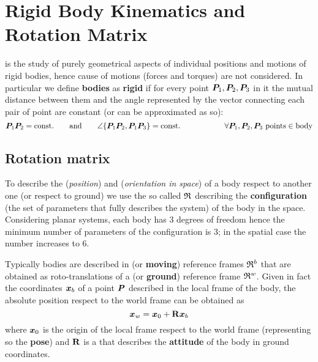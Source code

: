 \chapter{Rigid Body Kinematics and Rotation Matrix}
	
	 is the study of purely geometrical aspects of individual positions and motions of rigid bodies, hence cause of motions (forces and torques) are not considered. In particular we define \textbf{bodies} as \textbf{rigid} if for every point $\boldsymbol{P}_1, \boldsymbol{P}_2, \boldsymbol{P}_3$ in it the mutual distance between them and the angle represented by the vector connecting each pair of point are constant (or can be approximated as so):
	\[ \boldsymbol{P}_1 \boldsymbol{P}_2 = \textrm{const.} \qquad \textrm{and} \qquad \angle  \{ \boldsymbol{P}_1 \boldsymbol{P}_2, \boldsymbol{P}_1\boldsymbol{P}_3 \} = \textrm{const.} \hspace{2cm} \forall \boldsymbol{P}_1,\boldsymbol{P}_2, \boldsymbol{P}_3  \textrm{ points} \in \textrm{body} \]
	
\section{Rotation matrix}

	To describe the  (\textit{position}) and  (\textit{orientation in space}) of a body respect to another one (or respect to ground) we use the so called  $\mathfrak {R}_{}$ describing the \textbf{configuration} (the set of parameters that fully describes the system) of the body in the space. Considering planar systems, each body has 3 degrees of freedom hence the minimum number of parameters of the configuration is 3; in the spatial case the number increases to 6.
	
	Typically bodies are described in  (or \textbf{moving}) reference frames $\mathfrak{R}^b$ that are obtained as roto-translations of a  (or \textbf{ground}) reference frame $\mathfrak{R}^w$. Given in fact the coordinates $\boldsymbol{x}_b$ of a point $\boldsymbol{P}$ described in the local frame of the body, the absolute position respect to the world frame can be obtained as
	\begin{equation} \label{eq:rot:directtransformation}
		\boldsymbol{x}_w = \boldsymbol{x}_0 + \mathbf{R} \boldsymbol{x}_b
	\end{equation}
	where $\boldsymbol{x}_0$ is the origin of the local frame respect to the world frame (representing so the \textbf{pose}) and $\mathbf{R}$ is a  that describes the \textbf{attitude} of the body in ground coordinates.
	
